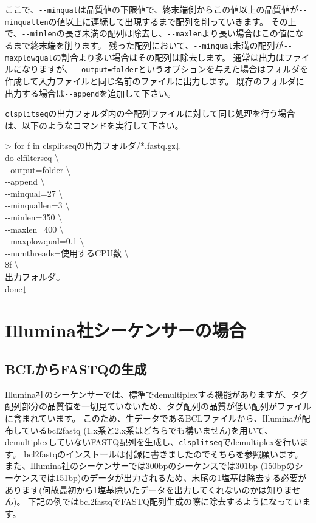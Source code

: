 \documentclass[titlepage,10pt,a4paper]{jsbook}
\newenvironment{cmd}{\begin{oframed}\raggedright\ttfamily\footnotesize\setlength{\baselineskip}{1.4em}}{\end{oframed}\vspace{-1em}}
\begin{document}
ここで、\texttt{{-}{-}minqual}は品質値の下限値で、終末端側からこの値以上の品質値が\texttt{{-}{-}minquallen}の値以上に連続して出現するまで配列を削っていきます。
その上で、\texttt{{-}{-}minlen}の長さ未満の配列は除去し、\texttt{{-}{-}maxlen}より長い場合はこの値になるまで終末端を削ります。
残った配列において、\texttt{{-}{-}minqual}未満の配列が\texttt{{-}{-}maxplowqual}の割合より多い場合はその配列は除去します。
通常は出力はファイルになりますが、\texttt{{-}{-}output=folder}というオプションを与えた場合はフォルダを作成して入力ファイルと同じ名前のファイルに出力します。
既存のフォルダに出力する場合は\texttt{{-}{-}append}を追加して下さい。

\texttt{clsplitseq}の出力フォルダ内の全配列ファイルに対して同じ処理を行う場合は、以下のようなコマンドを実行して下さい。

\begin{cmd}
{\textgreater} for f in clsplitseqの出力フォルダ/*.fastq.gz↓\\
do clfilterseq {\textbackslash}\\
{-}{-}output=folder {\textbackslash}\\
{-}{-}append {\textbackslash}\\
{-}{-}minqual=27 {\textbackslash}\\
{-}{-}minquallen=3 {\textbackslash}\\
{-}{-}minlen=350 {\textbackslash}\\
{-}{-}maxlen=400 {\textbackslash}\\
{-}{-}maxplowqual=0.1 {\textbackslash}\\
{-}{-}numthreads=使用するCPU数 {\textbackslash}\\
\$f {\textbackslash}\\
出力フォルダ↓\\
done↓
\end{cmd}

\section{Illumina社シーケンサーの場合}

\subsection{BCLからFASTQの生成}

Illumina社のシーケンサーでは、標準でdemultiplexする機能がありますが、タグ配列部分の品質値を一切見ていないため、タグ配列の品質が低い配列がファイルに含まれています。
このため、生データであるBCLファイルから、Illuminaが配布しているbcl2fastq (1.x系と2.x系はどちらでも構いません)を用いて、demultiplexしていないFASTQ配列を生成し、\texttt{clsplitseq}でdemultiplexを行います。
bcl2fastqのインストールは付録に書きましたのでそちらを参照願います。
また、Illumina社のシーケンサーでは300bpのシーケンスでは301bp (150bpのシーケンスでは151bp)のデータが出力されるため、末尾の1塩基は除去する必要があります(何故最初から1塩基除いたデータを出力してくれないのかは知りません)。
下記の例ではbcl2fastqでFASTQ配列生成の際に除去するようになっています。
\end{document}
